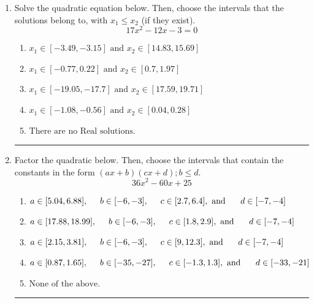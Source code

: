 \documentclass[14pt]{extbook}
\newcommand{\litem}[1]{\item#1\hspace*{-1cm}\rule{\textwidth}{0.4pt}}
\begin{document}
\begin{enumerate}
{\begin{enumerate}[label=\Alph*.]
\end{enumerate} }
\litem{
Solve the quadratic equation below. Then, choose the intervals that the solutions belong to, with $x_1 \leq x_2$ (if they exist).\[ 17x^{2} -12 x -3 = 0 \]\begin{enumerate}[label=\Alph*.]
\item \( x_1 \in [-3.49, -3.15] \text{ and } x_2 \in [14.83, 15.69] \)
\item \( x_1 \in [-0.77, 0.22] \text{ and } x_2 \in [0.7, 1.97] \)
\item \( x_1 \in [-19.05, -17.7] \text{ and } x_2 \in [17.59, 19.71] \)
\item \( x_1 \in [-1.08, -0.56] \text{ and } x_2 \in [0.04, 0.28] \)
\item \( \text{There are no Real solutions.} \)

\end{enumerate} }
\litem{
Factor the quadratic below. Then, choose the intervals that contain the constants in the form $(ax+b)(cx+d); b \leq d.$\[ 36x^{2} -60 x + 25 \]\begin{enumerate}[label=\Alph*.]
\item \( a \in [5.04, 6.88], \hspace*{5mm} b \in [-6, -3], \hspace*{5mm} c \in [2.7, 6.4], \text{ and } \hspace*{5mm} d \in [-7, -4] \)
\item \( a \in [17.88, 18.99], \hspace*{5mm} b \in [-6, -3], \hspace*{5mm} c \in [1.8, 2.9], \text{ and } \hspace*{5mm} d \in [-7, -4] \)
\item \( a \in [2.15, 3.81], \hspace*{5mm} b \in [-6, -3], \hspace*{5mm} c \in [9, 12.3], \text{ and } \hspace*{5mm} d \in [-7, -4] \)
\item \( a \in [0.87, 1.65], \hspace*{5mm} b \in [-35, -27], \hspace*{5mm} c \in [-1.3, 1.3], \text{ and } \hspace*{5mm} d \in [-33, -21] \)
\item \( \text{None of the above.} \)


\end{enumerate}}
\end{enumerate}
\end{document}
